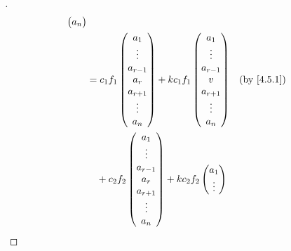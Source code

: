 \begin{proof}[]
\begin{align*}
\begin{pmatrix}
                                                                          a_n
                                                                        \end{pmatrix}   \\
     & = c_1 f_1\begin{pmatrix}
                  a_1       \\
                  \vdots    \\
                  a_{r - 1} \\
                  a_r       \\
                  a_{r + 1} \\
                  \vdots    \\
                  a_n
                \end{pmatrix} + k c_1 f_1\begin{pmatrix}
                                           a_1       \\
                                           \vdots    \\
                                           a_{r - 1} \\
                                           v         \\
                                           a_{r + 1} \\
                                           \vdots    \\
                                           a_n
                                         \end{pmatrix}             &  & \by{4.5.1}       \\
     & \quad + c_2 f_2\begin{pmatrix}
                        a_1       \\
                        \vdots    \\
                        a_{r - 1} \\
                        a_r       \\
                        a_{r + 1} \\
                        \vdots    \\
                        a_n
                      \end{pmatrix} + k c_2 f_2\begin{pmatrix}
                                                 a_1       \\
                                                 \vdots    \\

\end{pmatrix}
\end{align*}
\end{proof}

